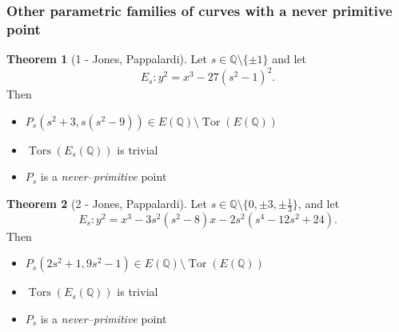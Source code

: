 \documentclass[12pt,handout]{beamer} %
\newcommand{\Q}{\mathbb Q}
\theoremstyle{definition}
\newtheorem{teo}{Theorem}
\begin{document}
 \begin{frame}
\frametitle{Other parametric families of curves with a never primitive point}

\begin{teo}[1 - Jones, Pappalardi]
Let $s\in\Q\setminus\{\pm1\}$ and let
$$E_s: y^2=x^3-27(s^2-1)^2.$$\pause
Then 
\begin{itemize}
 \item $P_s(s^2+3,s(s^2-9))\in E(\Q)\setminus\operatorname{Tor}(E(\Q))$
 \item $\operatorname{Tors}(E_s(\Q))$ is trivial %
 \item $P_s$ is a \emph{never--primitive} point %
\end{itemize}
\end{teo}\pause


\begin{teo}[2 - Jones, Pappalardi] Let $s\in\Q\setminus\{0,\pm3,\pm\frac13\}$, and let 
$$E_s: y^2=x^3-3s^2(s^2-8)x-2s^2(s^4-12s^2+24).$$\pause
Then 
\begin{itemize}
 \item $P_s(2s^2+1,9s^2-1)\in E(\Q)\setminus\operatorname{Tor}(E(\Q))$
 \item $\operatorname{Tors}(E_s(\Q))$ is trivial %
 \item $P_s$ is a \emph{never--primitive} point %
\end{itemize}
\end{teo}

\end{frame}
\end{document}
